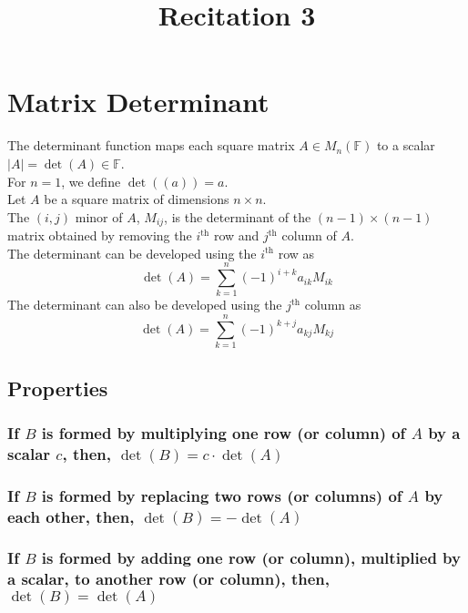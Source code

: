 \documentclass[fleqn]{article}
\title{Recitation 3}
\author{}
\date{\formatdate{12}{11}{2014}}
\begin{document}
\maketitle

\tableofcontents

\newpage
\section{Matrix Determinant}

The determinant function maps each square matrix $A \in M_n (\mathbb{F})$ to a scalar $|A| = \det(A) \in \mathbb{F}$.\\ 
For $n = 1$, we define $\det((a)) = a$.\\
Let $A$ be a square matrix of dimensions $n \times n$. \\
The $(i, j)$ minor of $A$, $M_{ij}$, is the determinant of the $(n-1) \times (n-1)$ matrix obtained by removing the $i^{\text{th}}$ row and $j^{\text{th}}$ column of $A$.\\
The determinant can be developed using the $i^{\text{th}}$ row as
\begin{equation*}
	\det (A) = \sum_{k = 1}^{n} (-1)^{i+k} a_{ik} M_{ik}
\end{equation*}
The determinant can also be developed using the $j^{\text{th}}$ column as
\begin{equation*}
\det (A) = \sum_{k = 1}^{n} (-1)^{k+j} a_{kj} M_{kj}
\end{equation*}

\subsection{Properties}

\subsubsection{If $B$ is formed by multiplying one row (or column) of $A$ by a scalar $c$, then, $\det (B) = c \cdot \det (A)$}

\subsubsection{If $B$ is formed by replacing two rows (or columns) of $A$ by each other, then, $\det (B) = - \det (A)$}

\subsubsection{If $B$ is formed by adding one row (or column), multiplied by a scalar, to another row (or column), then, $\det (B) = \det (A)$}
\end{document}
